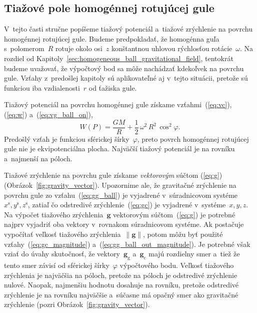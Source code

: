 \documentclass[a4paper, 12pt]{book}
\newcommand{\gidx}{\mathrm g}
\newcommand{\cidx}{\mathrm c}
\let\vec\mathbf
\begin{document}
\subsection{Tiažové pole homogénnej rotujúcej gule}
\label{sec:homogeneous_ball_gravity_field}

V~tejto časti stručne popíšeme tiažový potenciál a~tiažové zrýchlenie na 
povrchu homogénnej rotujúcej gule.  Budeme predpokladať, že homogénna guľa 
s~polomerom~$R$ rotuje okolo osi~$z$ konštantnou uhlovou rýchlosťou 
rotácie~$\omega$.  Na rozdiel od 
Kapitoly~\ref{sec:homogeneous_ball_gravitational_field}, tentokrát budeme 
uvažovať, že výpočtový bod sa môže nachádzať kdekoľvek na povrchu gule.  Vzťahy 
z~predošlej kapitoly sú aplikovateľné aj v~tejto situácii, pretože sú funkciou 
iba vzdialenosti~$r$ od ťažiska gule.

Tiažový potenciál na povrchu homogénnej gule získame vzťahmi~(\ref{eq:vc}), 
(\ref{eq:w}) a~(\ref{eq:vg_ball_on}),
%
\begin{equation}
\label{eq:w_ball_on}
W(P) = \frac{GM}{R} + \frac{1}{2} \, \omega^2 \, R^2 \, \cos^2\varphi{.}
\end{equation}
%
Predošlý vzťah je funkciou sférickej šírky~$\varphi$, preto povrch homogénnej 
rotujúcej gule nie je ekvipotenciálna plocha.  Najväčší tiažový potenciál je na 
rovníku a~najmenší na póloch.

Tiažové zrýchlenie na povrchu gule získame \emph{vektorovým} súčtom 
(\ref{eq:g}) (Obrázok~\ref{fig:gravity_vector}).  Upozornime ale, že gravitačné 
zrýchlenie na povrchu gule zo vzťahu~(\ref{eq:gg_ball}) je vyjadrené 
v~súradnicovom systéme~$x^\mathrm{s}, y^\mathrm{s}, z^\mathrm{s}$, zatiaľ čo 
odstredivé zrýchlenie~(\ref{eq:gc}) je vyjadrené v~systéme~$x, y, z$.  Na 
výpočet tiažového zrýchlenia~$\vec g$ vektorovým súčtom~(\ref{eq:g}) je 
potrebné najprv vyjadriť oba vektory v~rovnakom súradnicovom systéme.  Ak 
postačuje vypočítať veľkosť tiažového zrýchlenia~$\| \vec g \|$, potom môžu byť 
použité vzťahy~(\ref{eq:gc_magnitude}) a~(\ref{eq:gg_ball_out_magnitude}).  Je 
potrebné však vziať do úvahy skutočnosť, že vektory~$\vec g_\gidx$ a~$\vec 
g_\cidx$ majú rozdielny smer a~tiež že tento smer závisí od sférickej 
šírky~$\varphi$ výpočtového bodu.  Veľkosť tiažového zrýchlenia je najväčšia na 
póloch, pretože na póloch je odstredivé zrýchlenie nulové.  Naopak, najmenšiu 
hodnotu dosahuje na rovníku, pretože odstredivé zrýchlenie je na rovníku 
najväčšie a~súčasne má opačný smer ako gravitačné zrýchlenie (pozri 
Obrázok~\ref{fig:gravity_vector}).
\end{document}
